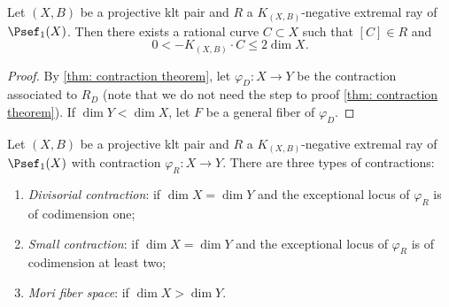     \begin{theorem}\label{thm:length_of_extremal_rays}
        Let \((X,B)\) be a projective klt pair and \(R\) a \(K_{(X,B)}\)-negative extremal ray of \(\Psef_1(X)\).
        Then there exists a rational curve \(C \subset X\) such that \([C] \in R\) and 
        \[ 0 < -K_{(X,B)} \cdot C \leq 2 \dim X. \]
    \end{theorem}
    \begin{proof}
        By \cref{thm: contraction theorem}, let \(\varphi_D: X \to Y\) be the contraction associated to \(R_D\) (note that we do not need the step to proof \cref{thm: contraction theorem}).
        If \(\dim Y < \dim X\), let \(F\) be a general fiber of \(\varphi_D\).
    \end{proof}

    \begin{definition}\label{def:types_of_contractions_in_MMP}
        Let \((X,B)\) be a projective klt pair and \(R\) a \(K_{(X,B)}\)-negative extremal ray of \(\Psef_1(X)\) with contraction \(\varphi_R: X \to Y\).
        There are three types of contractions:
        \begin{enumerate}
            \item \emph{Divisorial contraction}: if \(\dim X = \dim Y\) and the exceptional locus of \(\varphi_R\) is of codimension one;
            \item \emph{Small contraction}: if \(\dim X = \dim Y\) and the exceptional locus of \(\varphi_R\) is of codimension at least two;
            \item \emph{Mori fiber space}: if \(\dim X > \dim Y\).
        \end{enumerate}
    \end{definition}

